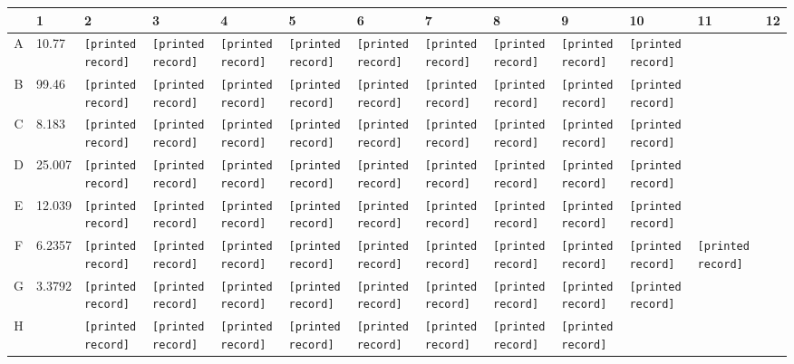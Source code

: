 \documentclass[UTF8,10pt,a4paper,fontset=fandol]{ctexart}
\newcommand{\fieldvalue}[1]{#1}
\begin{document}
\begin{center}
\scriptsize
\begin{tabular}{c|*{12}{p{0.55cm}|}}
 & 1 & 2 & 3 & 4 & 5 & 6 & 7 & 8 & 9 & 10 & 11 & 12\\ \hline
A &
\fieldvalue{10.77} &
\texttt{[printed record]} &
\texttt{[printed record]} &
\texttt{[printed record]} &
\texttt{[printed record]} &
\texttt{[printed record]} &
\texttt{[printed record]} &
\texttt{[printed record]} &
\texttt{[printed record]} &
\texttt{[printed record]} & & \\ \hline
B &
\fieldvalue{99.46} &
\texttt{[printed record]} &
\texttt{[printed record]} &
\texttt{[printed record]} &
\texttt{[printed record]} &
\texttt{[printed record]} &
\texttt{[printed record]} &
\texttt{[printed record]} &
\texttt{[printed record]} &
\texttt{[printed record]} & & \\ \hline
C &
\fieldvalue{8.183} &
\texttt{[printed record]} &
\texttt{[printed record]} &
\texttt{[printed record]} &
\texttt{[printed record]} &
\texttt{[printed record]} &
\texttt{[printed record]} &
\texttt{[printed record]} &
\texttt{[printed record]} &
\texttt{[printed record]} & & \\ \hline
D &
\fieldvalue{25.007} &
\texttt{[printed record]} &
\texttt{[printed record]} &
\texttt{[printed record]} &
\texttt{[printed record]} &
\texttt{[printed record]} &
\texttt{[printed record]} &
\texttt{[printed record]} &
\texttt{[printed record]} &
\texttt{[printed record]} & & \\ \hline
E &
\fieldvalue{12.039} &
\texttt{[printed record]} &
\texttt{[printed record]} &
\texttt{[printed record]} &
\texttt{[printed record]} &
\texttt{[printed record]} &
\texttt{[printed record]} &
\texttt{[printed record]} &
\texttt{[printed record]} &
\texttt{[printed record]} & & \\ \hline
F &
\fieldvalue{6.2357} &
\texttt{[printed record]} &
\texttt{[printed record]} &
\texttt{[printed record]} &
\texttt{[printed record]} &
\texttt{[printed record]} &
\texttt{[printed record]} &
\texttt{[printed record]} &
\texttt{[printed record]} &
\texttt{[printed record]} &
\texttt{[printed record]} & \\ \hline
G &
\fieldvalue{3.3792} &
\texttt{[printed record]} &
\texttt{[printed record]} &
\texttt{[printed record]} &
\texttt{[printed record]} &
\texttt{[printed record]} &
\texttt{[printed record]} &
\texttt{[printed record]} &
\texttt{[printed record]} &
\texttt{[printed record]} & & \\ \hline
H & & \texttt{[printed record]} & \texttt{[printed record]} &
\texttt{[printed record]} & \texttt{[printed record]} &
\texttt{[printed record]} & \texttt{[printed record]} &
\texttt{[printed record]} & \texttt{[printed record]} & & & \\
\end{tabular}
\end{center}
\end{document}
